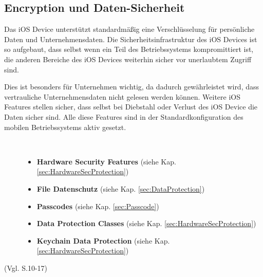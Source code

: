 \subsection{Encryption und Daten-Sicherheit}
\label{sec:DataEnc}
Das iOS Device unterstützt standardmäßig eine Verschlüsselung für persönliche Daten und Unternehmensdaten. Die Sicherheitsinfrastruktur des iOS Devices ist so aufgebaut, dass selbst wenn ein Teil des Betriebssystems kompromittiert ist, die anderen Bereiche des iOS Devices weiterhin sicher vor unerlaubtem Zugriff sind. \par
Dies ist besonders für Unternehmen wichtig, da dadurch gewährleistet wird, dass vertrauliche Unternehmensdaten nicht gelesen werden können. Weitere iOS Features stellen sicher, dass selbst bei Diebstahl oder Verlust des iOS Device die Daten sicher sind. Alle diese Features sind in der Standardkonfiguration des mobilen Betriebssystems aktiv gesetzt.
\begin{description}
\item[\parbox{\textwidth} {Apple führt unter dem Kapitel Encryption und Daten-Sicherheit folgende Features an}]~\par
	\begin{itemize}
		\item \textbf{Hardware Security Features} (siehe Kap. \ref{sec:HardwareSecProtection})
 		\item \textbf{File Datenschutz} (siehe Kap. \ref{sec:DataProtection})
 		\item \textbf{Passcodes} (siehe Kap. \ref{sec:Passcode})
 		\item \textbf{Data Protection Classes}  (siehe Kap. \ref{sec:HardwareSecProtection})
		\item \textbf{Keychain Data Protection} (siehe Kap. \ref{sec:HardwareSecProtection})
	\end{itemize}
\end{description}
(Vgl. \cite{Apple[4]} S.10-17)
